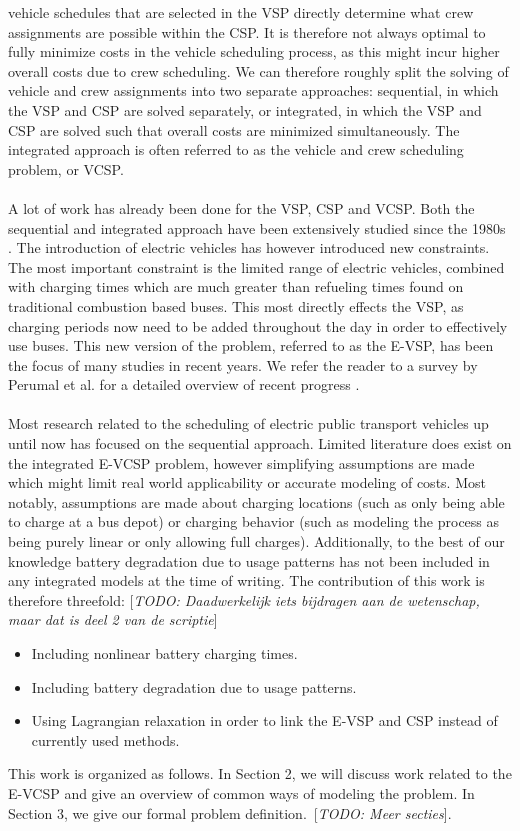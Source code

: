 \documentclass[]{article}
\newcommand{\todo}[1]{{\color{red}[\textit{TODO: #1}]}}
\begin{document}
vehicle schedules that are selected in the VSP directly determine what crew
assignments are possible within the CSP. It is therefore not always optimal to
fully minimize costs in the vehicle scheduling process, as this might incur
higher overall costs due to crew scheduling. We can therefore roughly split the
solving of vehicle and crew assignments into two separate approaches:
sequential, in which the VSP and CSP are solved separately, or integrated, in
which the VSP and CSP are solved such that overall costs are minimized
simultaneously. The integrated approach is often referred to as the vehicle and
crew scheduling problem, or VCSP. \\\\ A lot of work has already been done for the VSP, CSP and VCSP.
Both the sequential and integrated approach have been extensively studied since the 1980s \cite{Bodin1983}. The
introduction of electric vehicles has however introduced new constraints. The
most important constraint is the limited range of electric vehicles, combined
with charging times which are much greater than refueling times found on
traditional combustion based buses. This most directly effects the VSP, as
charging periods now need to be added throughout the day in order to
effectively use buses. This new version of the problem, referred to as the
E-VSP, has been the focus of many studies in recent years. We refer the reader
to a survey by Perumal et al. for a detailed overview of recent progress
\cite{Perumal2022LitRev}. \\\\ Most research related to the scheduling of
electric public transport vehicles up until now has focused on the sequential
approach. Limited literature does exist on the integrated E-VCSP problem, however
simplifying assumptions are made which might limit real world applicability or
accurate modeling of costs. Most notably, assumptions are made about charging
locations (such as only being able to charge at a bus depot) or charging
behavior (such as modeling the process as being purely linear or only allowing
full charges). Additionally, to the best of our knowledge battery degradation
due to usage patterns has not been included in any integrated models at the
time of writing. The contribution of this work is therefore threefold: \todo{Daadwerkelijk iets bijdragen aan de wetenschap, maar dat is deel 2 van de scriptie}
\begin{itemize}
  \item Including nonlinear battery charging times.
  \item Including battery degradation due to usage patterns.
  \item Using Lagrangian relaxation in order to link the E-VSP and CSP instead of
        currently used methods.
\end{itemize}
This work is organized as follows. In Section 2, we will discuss work related to the E-VCSP and give an overview of common ways of modeling the problem. In Section 3, we give our formal problem definition.\ \todo{Meer secties}.
\end{document}
